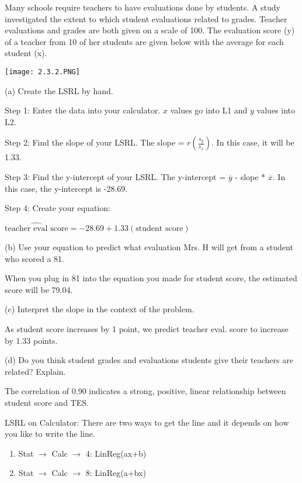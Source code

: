 \documentclass[../stats.tex]{subfiles}
\begin{document}
\begin{example}
    Many schools require teachers to have evaluations done by students. A study investigated the extent to which student evaluations related to grades. Teacher evaluations and grades are both given on a scale of 100. The evaluation score (y) of a teacher from 10 of her students are given below with the average for each student (x).
    \begin{center}
        \texttt{[image: 2.3.2.PNG]}
    \end{center}
    (a) Create the LSRL by hand.

    Step 1: Enter the data into your calculator. $x$ values go into L1 and $y$ values into L2.

    Step 2: Find the slope of your LSRL. The slope = $r\left(\frac{s_y}{s_x}\right)$. In this case, it will be 1.33.

    Step 3: Find the y-intercept of your LSRL. The y-intercept = $\overline{y}$ - slope * $\overline{x}$. In this case, the y-intercept is -28.69.

    Step 4: Create your equation: 

    $\hat{\text{teacher eval score}} = -28.69+1.33(\text{student score})$

    (b) Use your equation to predict what evaluation Mrs. H will get from a student who scored a 81.

    When you plug in 81 into the equation you made for student score, the estimated score will be 79.04.

    (c) Interpret the slope in the context of the problem.

    As student score increases by 1 point, we predict teacher eval. score to increase by 1.33 points.

    (d) Do you think student grades and evaluations students give their teachers are related? Explain.

    The correlation of 0.90 indicates a strong, positive, linear relationship between student score and TES.
\end{example}
LSRL on Calculator: There are two ways to get the line and it depends on how you like to write the line.
\begin{enumerate}
    \item Stat $\rightarrow$ Calc $\rightarrow$ 4: LinReg(ax+b)
    \item Stat $\rightarrow$ Calc $\rightarrow$ 8: LinReg(a+bx)
\end{enumerate}
\end{document}
